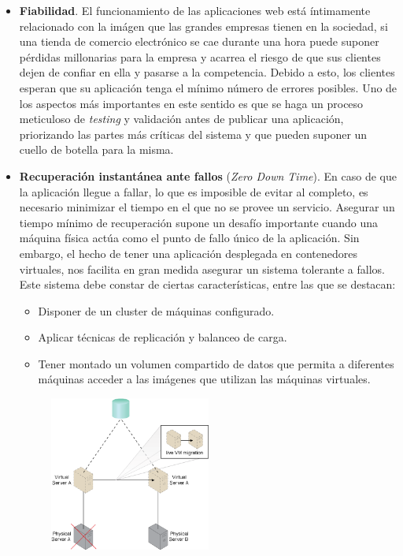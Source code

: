 \begin{itemize}
\item \textbf{Fiabilidad}. El funcionamiento de las aplicaciones web está íntimamente relacionado con la imágen que las grandes empresas tienen en la sociedad, si una tienda de comercio electrónico se cae durante una hora puede suponer pérdidas millonarias para la empresa y acarrea el riesgo de que sus clientes dejen de confiar en ella y pasarse a la competencia. Debido a esto, los clientes esperan que su aplicación tenga el mínimo número de errores posibles. Uno de los aspectos más importantes en este sentido es que se haga un proceso meticuloso de \emph{testing} y validación antes de publicar una aplicación, priorizando las partes más críticas del sistema y que pueden suponer un cuello de botella para la misma.
\item \textbf{Recuperación instantánea ante fallos} (\emph{Zero Down Time}\cite{zdwt}). En caso de que la aplicación llegue a fallar, lo que es imposible de evitar al completo, es necesario minimizar el tiempo en el que no se provee un servicio. Asegurar un tiempo mínimo de recuperación supone un desafío importante cuando una máquina física actúa como el punto de fallo único de la aplicación. Sin embargo, el hecho de tener una aplicación desplegada en contenedores virtuales, nos facilita en gran medida asegurar un sistema tolerante a fallos. Este sistema debe constar de ciertas características, entre las que se destacan:
\begin{itemize}
\item Disponer de un cluster de máquinas configurado.
\item Aplicar técnicas de replicación y balanceo de carga.
\item Tener montado un volumen compartido de datos que permita a diferentes máquinas acceder a las imágenes que utilizan las máquinas virtuales.
\end{itemize}
\begin{figure}
\centering
\includegraphics[width=0.5\textwidth]{spof.png}

\end{figure}
\end{itemize}
